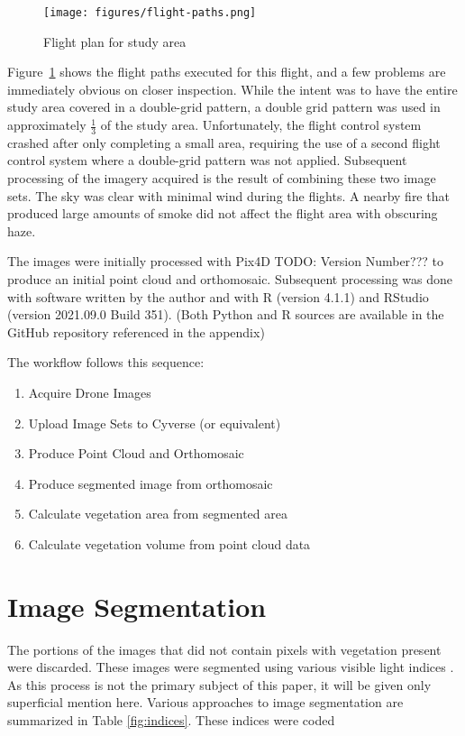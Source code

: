 \documentclass[letterpaper]{article}
\begin{document}
\begin{figure}[H]
\centering
  \texttt{[image: figures/flight-paths.png]} 
  \caption{Flight plan for study area}
  \label{fig:flight} 
\end{figure}

Figure~\ref{fig:flight} shows the flight paths executed for this flight, and a few problems are immediately obvious on closer inspection. While the intent was to have the entire study area covered in a double-grid pattern, a double grid pattern was used in approximately $\frac {1} {3}$ of the study area. Unfortunately, the flight control system crashed after only completing a small area, requiring the use of a second flight control system where a double-grid pattern was not applied. Subsequent processing of the imagery acquired is the result of combining these two image sets. The sky was clear with minimal wind during the flights. A nearby fire that produced large amounts of smoke did not affect the flight area with obscuring haze.

The images were initially processed with Pix4D TODO: Version Number??? to produce an initial point cloud and orthomosaic. Subsequent processing was done with software written by the author and with R (version 4.1.1) and RStudio (version 2021.09.0 Build 351). (Both Python and R sources are available in the GitHub repository referenced in the appendix)

The workflow follows this sequence:
\begin{enumerate}
	\item Acquire Drone Images
	\item Upload Image Sets to Cyverse (or equivalent)
	\item Produce Point Cloud and Orthomosaic
	\item Produce segmented image from orthomosaic
	\item Calculate vegetation area from segmented area
	\item Calculate vegetation volume from point cloud data
\end{enumerate}

%
%
\section{Image Segmentation}
The portions of the images that did not contain pixels with vegetation present were discarded. These images were segmented using various visible light indices \cite{Hamuda2016-dw}. As this process is not the primary subject of this paper, it will be given only superficial mention here.  Various approaches to image segmentation are  summarized in Table \ref{fig:indices}. These indices were coded
\end{document}
